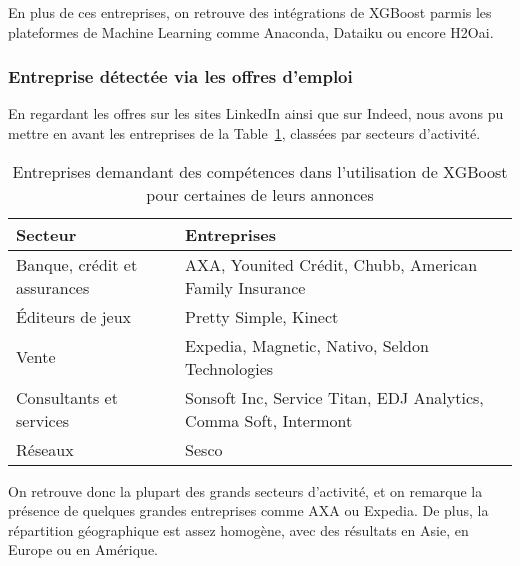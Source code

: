 En plus de ces entreprises, on retrouve des intégrations de XGBoost parmis les plateformes de Machine Learning comme Anaconda, Dataiku ou encore H2Oai.

\subsubsection{Entreprise détectée via les offres d'emploi}
En regardant les offres sur les sites LinkedIn ainsi que sur Indeed, nous avons pu mettre en avant les entreprises de la Table~\ref{tab:etps-sites}, classées par secteurs d'activité.

\begin{table}[h]
	\begin{margincap}
		\centering
		\begin{tabular}{p{}p{}}
		\toprule
		\textbf{Secteur} & \textbf{Entreprises} \\
		\midrule
		Banque, crédit et assurances & AXA, Younited Crédit, Chubb, American Family Insurance \\
		Éditeurs de jeux & Pretty Simple, Kinect \\
		Vente & Expedia, Magnetic, Nativo, Seldon Technologies \\ 
		Consultants et services & Sonsoft Inc, Service Titan, EDJ Analytics, Comma Soft, Intermont \\
		Réseaux & Sesco \\
		\bottomrule
		\end{tabular}
		\caption{Entreprises demandant des compétences dans l'utilisation de XGBoost pour certaines de leurs annonces}
		\label{tab:etps-sites}
	\end{margincap}
\end{table}

On retrouve donc la plupart des \og grands\fg{} secteurs d'activité, et on remarque la présence de quelques grandes entreprises comme AXA ou Expedia. De plus, la répartition géographique est assez homogène, avec des résultats en Asie, en Europe ou en Amérique.
